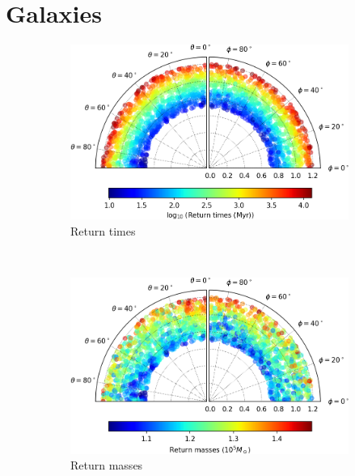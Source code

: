 \chapter{Galaxies}\label{ch: galaxies}

\begin{figure}[h]
    \centering
    \begin{subfigure}[t]{0.4\textwidth}
        \includegraphics[width = \textwidth]{"../Files/Week 13/images/21_time"}
        \caption{Return times}
    \end{subfigure}
    ~ 
    \begin{subfigure}[t]{0.4\textwidth}
        \includegraphics[width=\textwidth]{"../Files/Week 13/images/21_mass"}
        \caption{Return masses}
    \end{subfigure}
    \begin{subfigure}[t]{0.4\textwidth}

\end{subfigure}
\end{figure}
